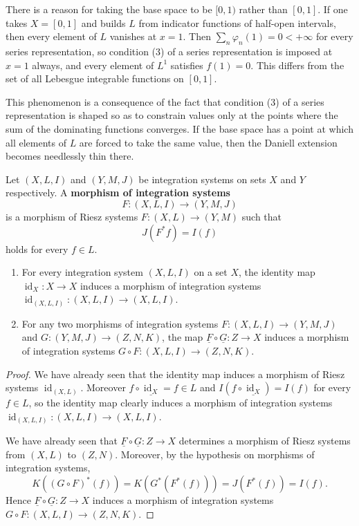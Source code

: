 \begin{remark}\label{rem:why-half-open}
  There is a reason for taking the base space to be $[0,1)$ rather than $[0,1]$.
  If one takes $X=[0,1]$ and builds $L$ from indicator functions of half-open
  intervals, then every element of $L$ vanishes at $x=1$.
  Then $\sum_n\varphi_n(1)=0<+\infty$ for every series representation, so
  condition (3) of a series representation is imposed at $x=1$ always, and every
  element of $L^1$ satisfies $f(1)=0$.
  This differs from the set of all Lebesgue integrable functions on $[0,1]$.

  This phenomenon is a consequence of the fact that condition (3) of a series
  representation is shaped so as to constrain values only at the points where the
  sum of the dominating functions converges.
  If the base space has a point at which all elements of $L$ are forced to take
  the same value, then the Daniell extension becomes needlessly thin there.
\end{remark}

\begin{definition}
  Let $(X,L,I)$ and $(Y,M,J)$ be integration systems on sets $X$ and
  $Y$ respectively.
  A \textbf{morphism of integration systems}
  \[
    F:(X,L,I)\to(Y,M,J)
  \]
  is a morphism of Riesz systems $F:(X,L)\to(Y,M)$ such that
  \[
    J(F^*f)=I(f)
  \]
  holds for every $f\in L$.
\end{definition}

\begin{lemma}
  \begin{enumerate}
    \item For every integration system $(X,L,I)$ on a set $X$, the
      identity map $\operatorname{id}_X:X\to X$ induces a morphism of
      integration systems
      $\operatorname{id}_{(X,L,I)}:(X,L,I)\to (X,L,I)$.
    \item For any two morphisms of integration systems
      $F:(X,L,I)\to(Y,M,J)$ and $G:(Y,M,J)\to(Z,N,K)$, the map
      $\underline{F}\circ\underline{G}:Z\to X$ induces a morphism of integration
      systems $G\circ F:(X,L,I)\to(Z,N,K)$.
  \end{enumerate}
\end{lemma}
\begin{proof}
  We have already seen that the identity map induces a morphism of Riesz systems
  $\operatorname{id}_{(X,L)}$.
  Moreover $f\circ\underline{\operatorname{id}_X}=f\in L$ and
  $I(f\circ\underline{\operatorname{id}_X})=I(f)$ for every $f\in L$, so the
  identity map clearly induces a morphism of integration systems
  $\operatorname{id}_{(X,L,I)}:(X,L,I)\to (X,L,I)$.

  We have already seen that $\underline{F}\circ\underline{G}:Z\to X$ determines a
  morphism of Riesz systems from $(X,L)$ to $(Z,N)$.
  Moreover, by the hypothesis on morphisms of integration systems,
  \[
    K((G\circ F)^*(f))=K(G^*(F^*(f)))=J(F^*(f))=I(f) .
  \]
  Hence $\underline{F}\circ\underline{G}:Z\to X$ induces a morphism of
  integration systems $G\circ F:(X,L,I)\to(Z,N,K)$.
\end{proof}

